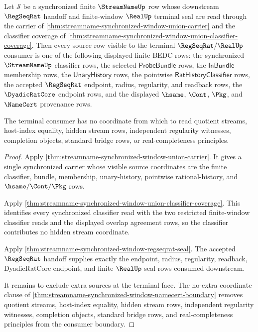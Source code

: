\begin{theorem}
\label{thm:streamname-synchronized-window-terminal-source-exhaustion}
Let $\mathcal S$ be a synchronized finite $\StreamNameUp$ row whose
downstream $\RegSeqRat$ handoff and finite-window $\RealUp$ terminal seal are
read through the carrier of
\autoref{thm:streamname-synchronized-window-union-carrier} and the classifier
coverage of
\autoref{thm:streamname-synchronized-window-union-classifier-coverage}. Then
every source row visible to the terminal $\RegSeqRat/\RealUp$ consumer is one
of the following displayed finite BEDC rows: the synchronized
$\StreamNameUp$ classifier rows, the selected $\mathsf{ProbeBundle}$ rows,
the $\mathsf{InBundle}$ membership rows, the $\mathsf{UnaryHistory}$ rows,
the pointwise $\mathsf{RatHistoryClassifier}$ rows, the accepted
$\RegSeqRat$ endpoint, radius, regularity, and readback rows, the
$\DyadicRatCore$ endpoint rows, and the displayed $\hsame$, $\Cont$, $\Pkg$,
and $\NameCert$ provenance rows.

The terminal consumer has no coordinate from which to read quotient streams,
host-index equality, hidden stream rows, independent regularity witnesses,
completion objects, standard bridge rows, or real-completeness principles.
\end{theorem}
\begin{proof}
Apply \autoref{thm:streamname-synchronized-window-union-carrier}. It gives a
single synchronized carrier whose visible source coordinates are the finite
classifier, bundle, membership, unary-history, pointwise rational-history,
and $\hsame/\Cont/\Pkg$ rows.

Apply \autoref{thm:streamname-synchronized-window-union-classifier-coverage}.
This identifies every synchronized classifier read with the two restricted
finite-window classifier reads and the displayed overlap agreement rows, so
the classifier contributes no hidden stream coordinate.

Apply \autoref{thm:streamname-synchronized-window-regseqrat-seal}. The
accepted $\RegSeqRat$ handoff supplies exactly the endpoint, radius,
regularity, readback, DyadicRatCore endpoint, and finite $\RealUp$ seal rows
consumed downstream.

It remains to exclude extra sources at the terminal face. The no-extra
coordinate clause of
\autoref{thm:streamname-synchronized-window-namecert-boundary} removes
quotient streams, host-index equality, hidden stream rows, independent
regularity witnesses, completion objects, standard bridge rows, and
real-completeness principles from the consumer boundary.
\end{proof}

